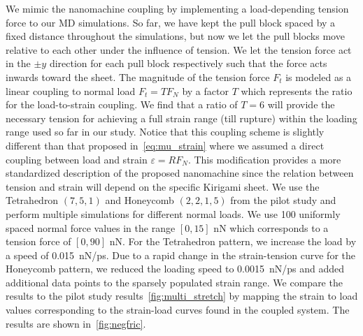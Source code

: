 We mimic the nanomachine coupling by implementing a load-depending tension force to our \acrshort{MD} simulations. So far, we have kept the pull block spaced by a fixed distance throughout the simulations, but now we let the pull blocks move relative to each other under the influence of tension. We let the tension force act in the $\pm y$ direction for each pull block respectively such that the force acts inwards toward the sheet. The magnitude of the tension force $F_t$ is modeled as a linear coupling to normal load $F_t = TF_N$ by a factor $T$ which represents the ratio for the load-to-strain coupling. We find that a ratio of
$T=6$ will provide the necessary tension for achieving a full strain range (till rupture) within the loading range used so far in our study. Notice that this coupling scheme is slightly different than that proposed in~\cref{eq:mu_strain} where we assumed a direct coupling between load and strain $\varepsilon = R F_N$. This modification provides a more standardized description of the proposed nanomachine since the relation between tension and strain will depend on the specific Kirigami sheet. We use the Tetrahedron
$(7,5,1)$ and Honeycomb $(2,2,1,5)$ from the pilot study and perform multiple
simulations for different normal loads. We use 100 uniformly spaced normal force
values in the range $[0, 15]$ nN which corresponds to a tension force of $[0, 90]$ nN. For the Tetrahedron pattern, we increase the load by a speed of \SI{0.015}{nN/ps}. Due to a rapid change in the strain-tension curve for the Honeycomb pattern, we reduced the loading speed to \SI{0.0015}{nN/ps} and added additional data points to the sparsely populated strain range. We compare the results to the pilot study results~\cref{fig:multi_stretch} by mapping the strain to load values corresponding to the strain-load curves found in the coupled system. The results are shown in~\cref{fig:negfric}.


